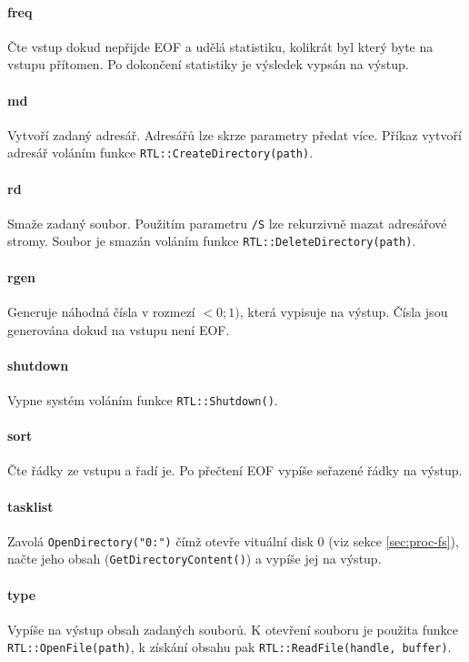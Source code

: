\documentclass[11pt,a4paper]{scrartcl}
\begin{document}
	
	\paragraph{freq}
	Čte vstup dokud nepřijde EOF a udělá statistiku, kolikrát byl který byte na vstupu přítomen. Po dokončení statistiky je výsledek vypsán na výstup. 
	
	\paragraph{md}
	Vytvoří zadaný adresář. Adresářů lze skrze parametry předat více. Příkaz vytvoří adresář voláním funkce \verb|RTL::CreateDirectory(path)|.
	
	\paragraph{rd}
	Smaže zadaný soubor. Použitím parametru \verb|/S| lze rekurzivně mazat adresářové stromy. Soubor je smazán voláním funkce \verb|RTL::DeleteDirectory(path)|.
	
	\paragraph{rgen}
	Generuje náhodná čísla v rozmezí $<0;1)$, která vypisuje na výstup. Čísla jsou generována dokud na vstupu není EOF.
	
	\paragraph{shutdown}
	Vypne systém voláním funkce \verb|RTL::Shutdown()|.
	
	\paragraph{sort}
	Čte řádky ze vstupu a řadí je. Po přečtení EOF vypíše seřazené řádky na výstup.
	
	\paragraph{tasklist}
	Zavolá \verb|OpenDirectory("0:")| čímž otevře vituální disk 0 (viz sekce \ref{sec:proc-fs}), načte jeho obsah (\verb|GetDirectoryContent()|) a vypíše jej na výstup.
	
	\paragraph{type}
	Vypíše na výstup obsah zadaných souborů. K otevření souboru je použita funkce \verb|RTL::OpenFile(path)|, k získání obsahu pak \verb|RTL::ReadFile(handle, buffer)|.
	
\end{document}
